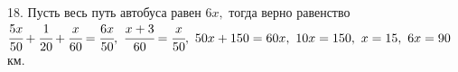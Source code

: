 18. Пусть весь путь автобуса равен $6x,$ тогда верно равенство $\cfrac{5x}{50}+\cfrac{1}{20}+\cfrac{x}{60}=\cfrac{6x}{50},\
\cfrac{x+3}{60}=\cfrac{x}{50},\ 50x+150=60x,\ 10x=150,\ x=15,\ 6x=90$км.\\
